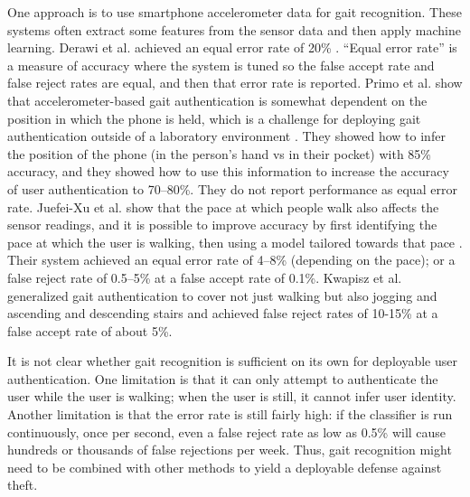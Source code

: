 \documentclass{soups}
\begin{document}
One approach is to use smartphone accelerometer data for gait recognition.
These systems often extract some features from the sensor data and then apply machine learning.
Derawi et al.  achieved an equal error rate of 20\% \cite{derawi:gait}.
``Equal error rate'' is a measure of accuracy where the system is tuned so the false accept rate and false reject rates are equal, and then that error rate is reported.
Primo et al. show that accelerometer-based gait authentication is somewhat dependent on the position in which the phone is held, which is a challenge for deploying gait authentication outside of a laboratory environment \cite{primo:context}. 
They showed how to infer the position of the phone (in the person's hand vs in their pocket) with 85\% accuracy, and they showed how to use this information to increase the accuracy of user authentication to 70--80\%.
They do not report performance as equal error rate.
Juefei-Xu et al. show that the pace at which people walk also affects the sensor readings, and it is possible to improve accuracy by first identifying the pace at which the user is walking, then using a model tailored towards that pace \cite{xu:pace}.
Their system achieved an equal error rate of 4--8\% (depending on the pace); or a false reject rate of 0.5--5\% at a false accept rate of 0.1\%.
Kwapisz et al. generalized gait authentication to cover not just walking but also jogging and ascending and descending stairs \cite{kwapisz:biometrics} and
achieved false reject rates of 10-15\% at a false accept rate of about 5\%.

It is not clear whether gait recognition is sufficient on its own for deployable user authentication.
One limitation is that it can only attempt to authenticate the user while the user is walking; when the user is still, it cannot infer user identity.
Another limitation is that the error rate is still fairly high: if the classifier is run continuously, once per second, even a false reject rate as low as 0.5\% will cause hundreds or thousands of false rejections per week.
Thus, gait recognition might need to be combined with other methods to yield a deployable defense against theft.
\end{document}
